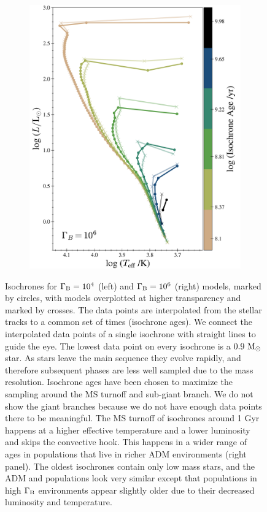 \documentclass[useAMS,usenatbib]{mnras}
\begin{document}
\begin{figure}
\begin{subfigure}{0.49\linewidth}
     \includegraphics[scale=0.4]{plots/isos_cb6.png}
   \end{subfigure}
\caption{Isochrones for $\Gamma_\mathrm{B} = 10^{4}$ (left) and $\Gamma_\mathrm{B} = 10^{6}$ (right) models, marked by circles, with \nodm models overplotted at higher transparency and marked by crosses. The data points are interpolated from the stellar tracks to a common set of times (isochrone ages). We connect the interpolated data points of a single isochrone with straight lines to guide the eye. The lowest data point on every isochrone is a $0.9 \ \mathrm{M}_{\odot}$ star. As stars leave the main sequence they evolve rapidly, and therefore subsequent phases are less well sampled due to the mass resolution. Isochrone ages have been chosen to maximize the sampling around the MS turnoff and sub-giant branch. We do not show the giant branches because we do not have enough data points there to be meaningful.
  The MS turnoff of isochrones around 1 Gyr happens at a higher effective temperature and a lower luminosity and skips the convective hook. This happens in a wider range of ages in populations that live in richer ADM environments (right panel). The oldest isochrones contain only low mass stars, and the ADM and \nodm populations look very similar except that populations in high $\Gamma_\mathrm{B}$ environments appear slightly older due to their decreased luminosity and temperature.
  } 
\label{fig:isos}
\end{figure}
\end{document}
